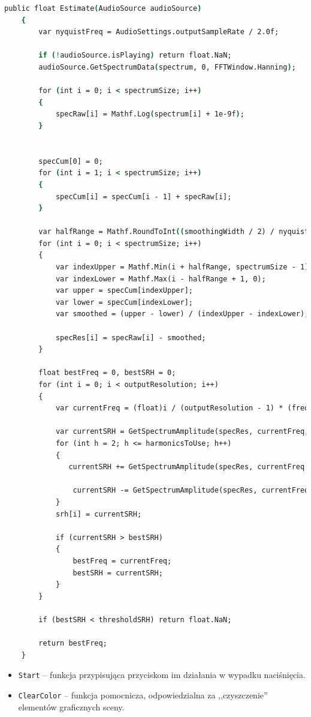 \begin{lstlisting}[language=csh,caption=Funkcja \texttt{Estimate}, label=lst:1]
    public float Estimate(AudioSource audioSource)
    {
        var nyquistFreq = AudioSettings.outputSampleRate / 2.0f;

        if (!audioSource.isPlaying) return float.NaN;
        audioSource.GetSpectrumData(spectrum, 0, FFTWindow.Hanning);
   
        for (int i = 0; i < spectrumSize; i++)
        {
            specRaw[i] = Mathf.Log(spectrum[i] + 1e-9f);
        }

       
        specCum[0] = 0;
        for (int i = 1; i < spectrumSize; i++)
        {
            specCum[i] = specCum[i - 1] + specRaw[i];
        }
   
        var halfRange = Mathf.RoundToInt((smoothingWidth / 2) / nyquistFreq * spectrumSize);
        for (int i = 0; i < spectrumSize; i++)
        {
            var indexUpper = Mathf.Min(i + halfRange, spectrumSize - 1);
            var indexLower = Mathf.Max(i - halfRange + 1, 0);
            var upper = specCum[indexUpper];
            var lower = specCum[indexLower];
            var smoothed = (upper - lower) / (indexUpper - indexLower);

            specRes[i] = specRaw[i] - smoothed;
        }

        float bestFreq = 0, bestSRH = 0;
        for (int i = 0; i < outputResolution; i++)
        {
            var currentFreq = (float)i / (outputResolution - 1) * (frequencyMax - frequencyMin) + frequencyMin;

            var currentSRH = GetSpectrumAmplitude(specRes, currentFreq, nyquistFreq);
            for (int h = 2; h <= harmonicsToUse; h++)
            {
               currentSRH += GetSpectrumAmplitude(specRes, currentFreq * h, nyquistFreq);

                currentSRH -= GetSpectrumAmplitude(specRes, currentFreq * (h - 0.5f), nyquistFreq);
            }
            srh[i] = currentSRH;
 
            if (currentSRH > bestSRH)
            {
                bestFreq = currentFreq;
                bestSRH = currentSRH;
            }
        }
        
        if (bestSRH < thresholdSRH) return float.NaN;

        return bestFreq;
    }
\end{lstlisting}

\begin{itemize}
    \item \texttt{Start} -- funkcja przypisująca przyciskom im działania w wypadku naciśnięcia.
    \item \texttt{ClearColor} -- funkcja pomocnicza, odpowiedzialna za ,,czyszczenie'' elementów graficznych sceny.
\end{itemize}

